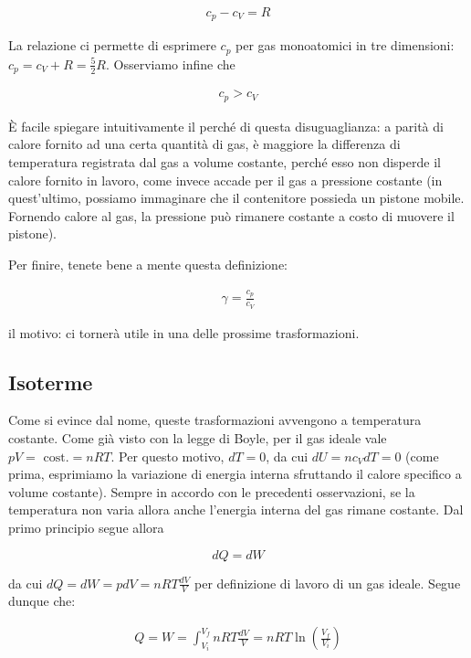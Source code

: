 \begin{tcolorbox}[colback = red!30, colframe = red!30!black, title = {Relazione di Mayer}]
\begin{align}
    c_p - c_V = R
\end{align}
\end{tcolorbox}

\noindent La relazione ci permette di esprimere $c_p$ per gas
monoatomici in tre dimensioni: $c_p = c_V + R = \frac52 R$.
Osserviamo infine che

\begin{align}
    c_p > c_V
\end{align}

\noindent È facile spiegare intuitivamente
il perché di questa disuguaglianza: a parità di calore fornito ad
una certa quantità di gas, è maggiore la differenza di temperatura
registrata dal gas a volume costante, perché esso non disperde il
calore fornito in lavoro, come invece accade per il gas a pressione
costante (in quest'ultimo, possiamo immaginare che il contenitore
possieda un pistone mobile. Fornendo calore al gas, la pressione
può rimanere costante a costo di muovere il pistone).

Per finire, tenete bene a mente questa definizione:

\begin{align}
    \gamma = \frac{c_p}{c_V}\label{gamgam}
\end{align}

\noindent il motivo: ci tornerà utile in una delle prossime trasformazioni.


\subsection{Isoterme}
Come si evince dal nome, queste trasformazioni avvengono a temperatura
costante. Come già visto con la legge di Boyle, per il gas ideale
vale $pV = \text{ cost.} = nRT$. Per questo motivo, $dT = 0$, da cui
$dU = nc_VdT = 0$ (come prima, esprimiamo la variazione di energia
interna sfruttando il calore specifico a volume costante). Sempre in
accordo con le precedenti osservazioni, se la temperatura non varia
allora anche l'energia interna del gas rimane costante. Dal primo
principio segue allora

\[ dQ = dW \]

\noindent da cui $dQ = dW = pdV = nRT\frac{dV}{V}$ per definizione di lavoro
di un gas ideale. Segue dunque che:

\begin{align}
    Q = W = \int_{V_i}^{V_f}nRT\frac{dV}{V} = nRT\ln\left(\frac{V_f}{V_i}\right)
\end{align}


